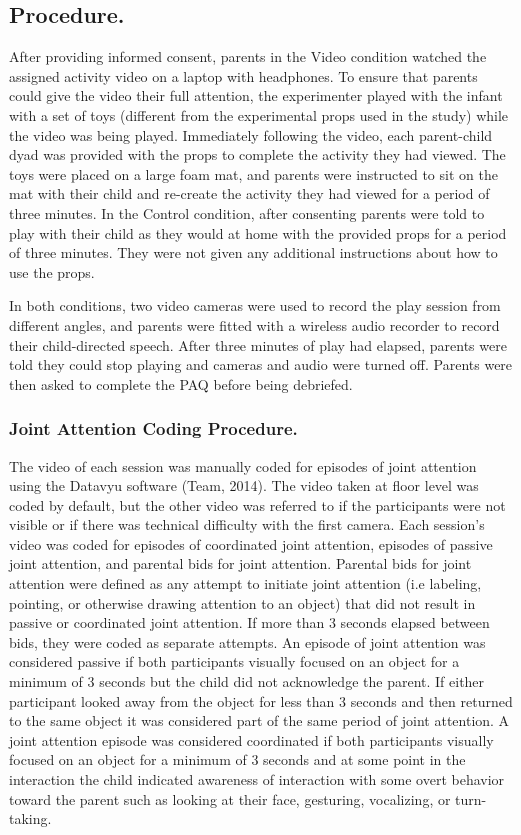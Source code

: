 \documentclass[10pt, letterpaper]{article}
\begin{document}
\subsection{Procedure.}\label{procedure.}

After providing informed consent, parents in the Video condition watched
the assigned activity video on a laptop with headphones. To ensure that
parents could give the video their full attention, the experimenter
played with the infant with a set of toys (different from the
experimental props used in the study) while the video was being played.
Immediately following the video, each parent-child dyad was provided
with the props to complete the activity they had viewed. The toys were
placed on a large foam mat, and parents were instructed to sit on the
mat with their child and re-create the activity they had viewed for a
period of three minutes. In the Control condition, after consenting
parents were told to play with their child as they would at home with
the provided props for a period of three minutes. They were not given
any additional instructions about how to use the props.

In both conditions, two video cameras were used to record the play
session from different angles, and parents were fitted with a wireless
audio recorder to record their child-directed speech. After three
minutes of play had elapsed, parents were told they could stop playing
and cameras and audio were turned off. Parents were then asked to
complete the PAQ before being debriefed.

\subsubsection{Joint Attention Coding
Procedure.}\label{joint-attention-coding-procedure.}

The video of each session was manually coded for episodes of joint
attention using the Datavyu software (Team, 2014). The video taken at
floor level was coded by default, but the other video was referred to if
the participants were not visible or if there was technical difficulty
with the first camera. Each session's video was coded for episodes of
coordinated joint attention, episodes of passive joint attention, and
parental bids for joint attention. Parental bids for joint attention
were defined as any attempt to initiate joint attention (i.e labeling,
pointing, or otherwise drawing attention to an object) that did not
result in passive or coordinated joint attention. If more than 3 seconds
elapsed between bids, they were coded as separate attempts. An episode
of joint attention was considered passive if both participants visually
focused on an object for a minimum of 3 seconds but the child did not
acknowledge the parent. If either participant looked away from the
object for less than 3 seconds and then returned to the same object it
was considered part of the same period of joint attention. A joint
attention episode was considered coordinated if both participants
visually focused on an object for a minimum of 3 seconds and at some
point in the interaction the child indicated awareness of interaction
with some overt behavior toward the parent such as looking at their
face, gesturing, vocalizing, or turn-taking.
\end{document}
